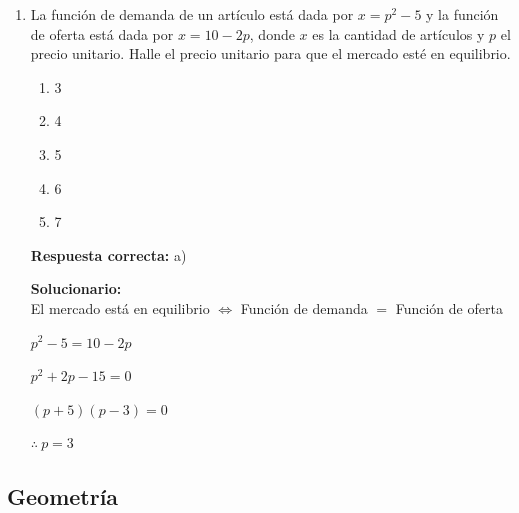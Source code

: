 \begin{enumerate}
	\item La función de demanda de un artículo está dada por $x=p^2-5$ y la función de oferta está dada por $x=10-2p$, donde $x$ es la cantidad de artículos y $p$ el precio unitario. Halle el precio unitario para que el mercado esté en equilibrio.
	
	\begin{enumerate}[label=\alph*)]
		\item 3
		\item 4
		\item 5
		\item 6
		\item 7
	\end{enumerate}
	\textbf{Respuesta correcta:} a)
	
	\vspace{2mm}
	\textbf{Solucionario:}\\
	
	El mercado está en equilibrio $\Leftrightarrow$ Función de demanda $=$ Función de oferta
	
	$p^2-5=10-2p$
	
	$p^2+2p-15=0$
	
	$(p+5)(p-3)=0$
	
	$\therefore\ p=3$
	
	\vspace{6mm}
	
\end{enumerate}




\subsection*{Geometría}

